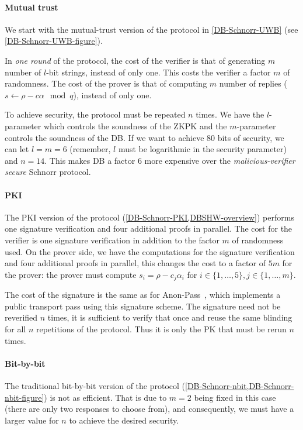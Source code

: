 \paragraph*{Mutual trust}

We start with the mutual-trust version of the protocol in \cref{DB-Schnorr-UWB} 
(see \cref{DB-Schnorr-UWB-figure}).

In \emph{one round} of the protocol, the cost of the verifier is that of 
generating \(m\) number of \(l\)-bit strings, instead of only one.
This costs the verifier a factor \(m\) of randomness.
The cost of the prover is that of computing \(m\) number of replies (\(s\gets 
\rho - c \alpha \mod q\)), instead of only one.

To achieve security, the protocol must be repeated \(n\) times.
We have the \(l\)-parameter which controls the soundness of the \ac{ZKPK} and 
the \(m\)-parameter controls the soundness of the \acl{DB}.
If we want to achieve 80 bits of security, we can let \(l = m = 6\) (remember, 
\(l\) must be logarithmic in the security parameter) and \(n = 14\).
This makes \acl{DB} a factor \(6\) more expensive over the 
\emph{malicious-verifier secure} Schnorr protocol.

\paragraph*{\acs*{PKI}}

The \ac{PKI} version of the protocol (\cref{DB-Schnorr-PKI,DBSHW-overview}) 
performs one signature verification and four additional proofs in parallel.
The cost for the verifier is one signature verification in addition to the 
factor \(m\) of randomness used.
On the prover side, we have the computations for the signature verification and 
four additional proofs in parallel, this changes the cost to a factor of \(5m\) 
for the prover: the prover must compute \(s_i = \rho - c_j \alpha_i\) for 
\(i\in \{1, \dotsc, 5\}, j\in \{1, \dotsc, m\}\).

The cost of the signature is the same as for Anon-Pass~\cite{AnonPass}, which 
implements a public transport pass using this signature scheme.
The signature need not be reverified \(n\) times, it is sufficient to verify 
that once and reuse the same blinding for all \(n\) repetitions of the 
protocol.
Thus it is only the \acl{PK} that must be rerun \(n\) times.

\paragraph*{Bit-by-bit}

The traditional bit-by-bit version of the protocol 
(\cref{DB-Schnorr-nbit,DB-Schnorr-nbit-figure}) is not as efficient.
That is due to \(m = 2\) being fixed in this case (there are only two responses 
to choose from), and consequently, we must have a larger value for \(n\) to 
achieve the desired security.

